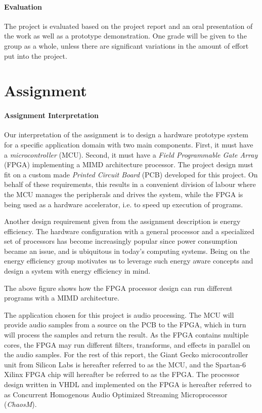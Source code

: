 \paragraph{Evaluation}
The project is evaluated based on the project report and an oral presentation of
the work as well as a prototype demonstration. One grade will be given to the
group as a whole, unless there are significant variations in the amount of
effort put into the project.

\section{Assignment}

\paragraph{Assignment Interpretation}\label{intro:our-assignment-interpretation}
Our interpretation of the assignment is to design a hardware prototype system for a
specific application domain with two main components. First, it must have a
\textit{microcontroller} (MCU). Second, it must have a \textit{Field Programmable Gate Array} (FPGA)
implementing a MIMD architecture processor. The project design must fit on a custom
made \textit{Printed Circuit Board} (PCB) developed for this project. On behalf of these
requirements, this results in a convenient division of labour where the MCU manages
the peripherals and drives the system, while the FPGA is being used as a hardware
accelerator, i.e. to speed up execution of programs.

Another design requirement given from the assignment description is energy
efficiency. The hardware configuration with a general processor and a
specialized set of processors has become increasingly popular since power
consumption became an issue, and is ubiquitous in today's computing systems.
Being on the energy efficiency group motivates us to leverage such energy aware
concepts and design a system with energy efficiency in mind.


The above figure shows how the FPGA processor
design can run different programs with a MIMD architecture.

The application chosen for this project is audio processing. The MCU will
provide audio samples from a source on the PCB to the FPGA, which in turn will
process the samples and return the result. As the FPGA contains multiple cores,
the FPGA may run different filters, transforms, and effects in parallel on the
audio samples. For the rest of this report, the Giant Gecko microcontroller unit
from Silicon Labs is hereafter referred to as the MCU, and the Spartan-6 Xilinx
FPGA chip will hereafter be referred to as the FPGA. The processor design
written in VHDL and implemented on the FPGA is hereafter referred to as
Concurrent Homogenous Audio Optimized Streaming Microprocessor (\textit{ChaosM}).

